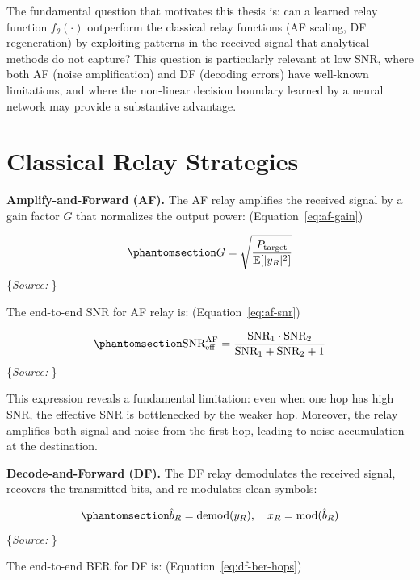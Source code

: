 \documentclass[
  english,
  12pt,
  12pt,
  a4paper,
  oneside]{report}
\begin{document}
The fundamental question that motivates this thesis is: can a learned relay function \(f_\theta(\cdot)\) outperform the classical relay functions (AF scaling, DF regeneration) by exploiting patterns in the received signal that analytical methods do not capture? This question is particularly relevant at low SNR, where both AF (noise amplification) and DF (decoding errors) have well-known limitations, and where the non-linear decision boundary learned by a neural network may provide a substantive advantage.

\section{Classical Relay Strategies}\label{sec:classical-relay-strategies}

\textbf{Amplify-and-Forward (AF).} The AF relay amplifies the received signal by a gain factor \(G\) that normalizes the output power: (Equation~\ref{eq:af-gain})

\begin{equation}\protect\phantomsection\label{eq:af-gain}{G = \sqrt{\frac{P_{\text{target}}}{\mathbb{E}[|y_R|^2]}}
}\end{equation} \footnotesize\{\textit{Source: \1}\}\normalsize

The end-to-end SNR for AF relay is: (Equation~\ref{eq:af-snr})

\begin{equation}\protect\phantomsection\label{eq:af-snr}{\text{SNR}_{\text{eff}}^{\text{AF}} = \frac{\text{SNR}_1 \cdot \text{SNR}_2}{\text{SNR}_1 + \text{SNR}_2 + 1}
}\end{equation} \footnotesize\{\textit{Source: \1}\}\normalsize

This expression reveals a fundamental limitation: even when one hop has high SNR, the effective SNR is bottlenecked by the weaker hop. Moreover, the relay amplifies both signal and noise from the first hop, leading to noise accumulation at the destination.

\textbf{Decode-and-Forward (DF).} The DF relay demodulates the received signal, recovers the transmitted bits, and re-modulates clean symbols:

\begin{equation}\protect\phantomsection\label{eq:df-demod-remod}{\hat{b}_R = \text{demod}(y_R), \quad x_R = \text{mod}(\hat{b}_R)
}\end{equation} \footnotesize\{\textit{Source: \1}\}\normalsize

The end-to-end BER for DF is: (Equation~\ref{eq:df-ber-hops})
\end{document}
